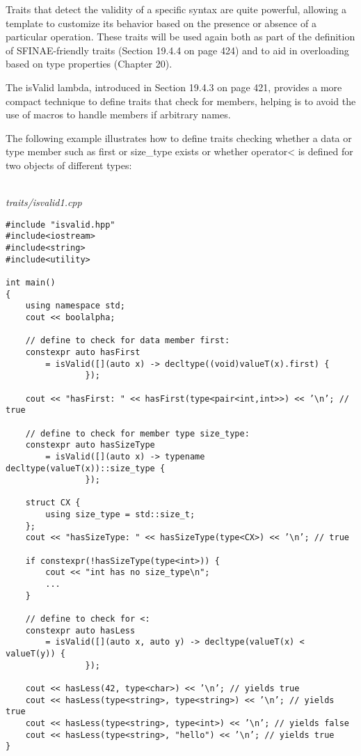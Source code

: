 Traits that detect the validity of a specific syntax are quite powerful, allowing a template to customize its behavior based on the presence or absence of a particular operation. These traits will be used again both as part of the definition of SFINAE-friendly traits (Section 19.4.4 on page 424) and to aid in overloading based on type properties (Chapter 20).


The isValid lambda, introduced in Section 19.4.3 on page 421, provides a more compact technique to define traits that check for members, helping is to avoid the use of macros to handle members if arbitrary names.

The following example illustrates how to define traits checking whether a data or type member such as first or size\_type exists or whether operator< is defined for two objects of different types:

\hspace*{\fill} \\ %
\noindent
\textit{traits/isvalid1.cpp}
\begin{lstlisting}[style=styleCXX]
#include "isvalid.hpp"
#include<iostream>
#include<string>
#include<utility>

int main()
{
	using namespace std;
	cout << boolalpha;
	
	// define to check for data member first:
	constexpr auto hasFirst
		= isValid([](auto x) -> decltype((void)valueT(x).first) {
				});

	cout << "hasFirst: " << hasFirst(type<pair<int,int>>) << ’\n’; // true
	
	// define to check for member type size_type:
	constexpr auto hasSizeType
		= isValid([](auto x) -> typename decltype(valueT(x))::size_type {
				});
			
	struct CX {
		using size_type = std::size_t;
	};
	cout << "hasSizeType: " << hasSizeType(type<CX>) << ’\n’; // true
	
	if constexpr(!hasSizeType(type<int>)) {
		cout << "int has no size_type\n";
		...
	}

	// define to check for <:
	constexpr auto hasLess
		= isValid([](auto x, auto y) -> decltype(valueT(x) < valueT(y)) {
				});
			
	cout << hasLess(42, type<char>) << ’\n’; // yields true
	cout << hasLess(type<string>, type<string>) << ’\n’; // yields true
	cout << hasLess(type<string>, type<int>) << ’\n’; // yields false
	cout << hasLess(type<string>, "hello") << ’\n’; // yields true
}
\end{lstlisting}

